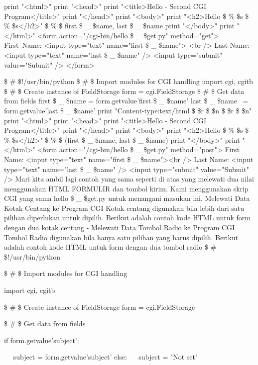 \begin{12pt}
\begin{12pt}
\begin{12pt}
\begin{12pt}
print "<html>" 
print "<head>" 
print "<title>Hello - Second CGI Program</title>" 
print "</head>" 
print "<body>" 
print "<h2>Hello  \$  \%  \$s  \$  \%  \$s</h2>"  \$  \%  \$ {first \$  \_  \$name, last \$  \_  \$name}
print "</body>" 
print "</html>" 
<form action="/cgi-bin/hello \$  \_  \$get.py" method="get"> 
First~Name: <input type="text" name="first \$  \_  \$name">  <br /> 
Last Name: <input type="text" name="last \$  \_  \$name" /> 
<input type="submit" value="Submit" />
</form>
\begin{12pt}
 \$  \#  \$!/usr/bin/python 
 \$  \#  \$ Import modules for CGI handling  
import cgi, cgitb  
 \$  \#  \$ Create instance of FieldStorage 
form = cgi.FieldStorage{}  
 \$  \#  \$ Get data from fields
first \$  \_  \$name = form.getvalue{'first \$  \_  \$name'} 
last \$  \_  \$name~ = form.getvalue{'last \$  \_  \$name'}
print "Content-type:text/html \$  \setminus  \$r \$  \setminus  \$n \$  \setminus  \$r \$  \setminus  \$n"
print "<html>"
print "<head>" 
print "<title>Hello - Second CGI Program</title>" 
print "</head>" 
print "<body>" 
print "<h2>Hello  \$  \%  \$s  \$  \%  \$s</h2>" \$  \%  \$ (first \$  \_  \$name, last \$  \_  \$name) 
print "</body>" 
print "</html>" 
<form action="/cgi-bin/hello \$  \_  \$get.py" method="post"> 
First Name: <input type="text" name="first \$  \_  \$name"><br /> 
Last Name: <input type="text" name="last \$  \_  \$name" /> 
<input type="submit" value="Submit" /> 
Mari kita ambil lagi contoh yang sama seperti di atas yang melewati dua nilai menggunakan HTML FORMULIR dan tombol kirim. Kami menggunakan skrip CGI yang sama hello \$  \_  \$get.py untuk menangani masukan ini. 
Melewati Data Kotak Centang ke Program CGI 
Kotak centang digunakan bila lebih dari satu pilihan diperlukan untuk dipilih. 
Berikut adalah contoh kode HTML untuk form dengan dua kotak centang - 
Melewati Data Tombol Radio ke Program CGI 
Tombol Radio digunakan bila hanya satu pilihan yang harus dipilih. 
Berikut adalah contoh kode HTML untuk form dengan dua tombol radio  
 \$  \#  \$!/usr/bin/python 

 \$  \#  \$ Import modules for CGI handling  

import cgi, cgitb 

 \$  \#  \$ Create instance of FieldStorage  
\noindent 
form = cgi.FieldStorage{}

 \$  \#  \$ Get data from fields

if form.getvalue{'subject'}: 

~~ subject = form.getvalue{'subject'} 
else: 
~~ subject = "Not set" 


\end{12pt}
\end{12pt}
\end{12pt}
\end{12pt}
\end{12pt}
